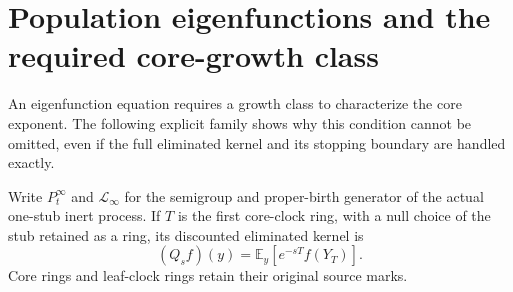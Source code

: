 \section{Population eigenfunctions and the required core-growth class}
\label{pm:section}

An eigenfunction equation requires a growth class to characterize the
core exponent.  The following explicit family shows why this condition
cannot be omitted, even if the full eliminated kernel and its stopping
boundary are handled exactly.

Write $P_t^\infty$ and $\mathcal L_\infty$ for the semigroup and
proper-birth generator of the actual one-stub inert process.  If $T$ is
the first core-clock ring, with a null choice of the stub retained as
a ring, its discounted eliminated kernel is
\[
 (Q_sf)(y)=\mathbb E_y[e^{-sT}f(Y_T)].
\]
Core rings and leaf-clock rings retain their original source marks.


